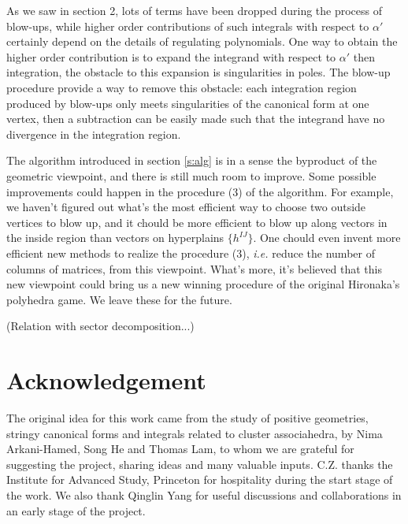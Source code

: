 \documentclass[12pt]{article}
\theoremstyle{definition}
\theoremstyle{plain}
\begin{document}
As we saw in section 2, lots of terms have been dropped during the process of blow-ups, while higher order contributions of such integrals with respect to $\alpha'$ certainly depend on the details of regulating polynomials. One way to obtain the higher order contribution is to expand the integrand with respect to $\alpha'$ then integration, the obstacle to this expansion is singularities in poles. The blow-up procedure provide a way to remove this obstacle: each integration region produced by blow-ups only meets singularities of the canonical form at one vertex, then a subtraction can be easily made such that the integrand have no divergence in the integration region.

The algorithm introduced in section \ref{s:alg} is in a sense 
the byproduct of the geometric viewpoint, and there is still much room to improve.
Some possible improvements could happen in the procedure (3) of the algorithm. 
For example, we haven't figured out what's the most efficient way to choose 
two outside vertices to blow up, 
and it chould be more efficient to blow up along vectors in the inside region than
vectors on hyperplains $\{h^{IJ}\}$. One chould even invent more efficient new methods 
to realize the procedure (3), \textit{i.e.} reduce the number of columns of matrices, 
from this viewpoint. What's more, it's believed that this new viewpoint could bring
us a new winning procedure of the original Hironaka's polyhedra game. 
We leave these for the future.

(Relation with sector decomposition...)

\section*{Acknowledgement}
The original idea for this work came from the study of positive geometries, 
stringy canonical forms and integrals related to cluster associahedra,
by Nima Arkani-Hamed, Song He and Thomas Lam, to whom we are grateful 
for suggesting the project, sharing ideas and many valuable inputs.  C.Z. thanks the Institute for Advanced Study, Princeton
 for hospitality during the start stage of the work. We also thank Qinglin Yang for useful discussions and collaborations in an early stage of the
project.

\end{document}
